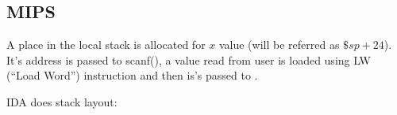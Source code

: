 \ifx\RUSSIAN\undefined
\subsection{MIPS}

A place in the local stack is allocated for $x$ value (will be referred as $\$sp+24$).
It's address is passed to scanf(), a value read from user is loaded using LW (``Load Word'') instruction
and then is's passed to \printf.



IDA does stack layout:



\fi
